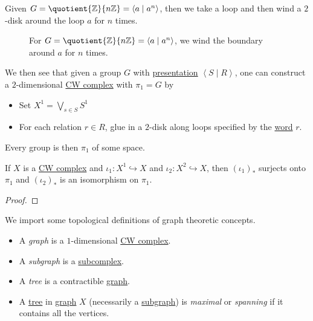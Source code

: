 \begin{eg}
	Given \(G = \quotient{\mathbb{\MakeUppercase{z}} }{n\mathbb{\MakeUppercase{z}} } = \left< a\mid a^n \right>\), then we take a loop and then wind a \(2\)-disk
	around the loop \(a\) for \(n\) times.
	\begin{figure}[H]
		\centering
		\caption{For \(G = \quotient{\mathbb{\MakeUppercase{z}}}{n\mathbb{\MakeUppercase{z}} } = \left< a \mid a^n \right> \), we wind the boundary around \(a\) for \(n\) times.}
		\label{fig:lec12-eg}
	\end{figure}
\end{eg}

We then see that given a group \(G\) with \hyperref[def:group-presentation]{presentation} \(\left< S \mid R \right> \), one can construct a \(2\)-dimensional \hyperref[def:CW-Complex]{CW complex}
with \(\pi _1 = G\) by
\begin{itemize}
	\item Set \(X^1 = \bigvee_{s\in S} S^1\)
	\item For each relation \(r\in R\), glue in a \(2\)-disk along loops specified by the \hyperref[def:word]{word} \(r\).
\end{itemize}
Every group is then \(\pi _1\) of some space.

\begin{theorem}
	If \(X\) is a \hyperref[def:CW-Complex]{CW complex} and \(\iota _1\colon X^1\hookrightarrow X\) and \(\iota_2 \colon X^2\hookrightarrow X\),
	then \((\iota _1)_{\ast}\) surjects onto \(\pi _1\) and \((\iota _2)_{\ast}\) is an isomorphism on \(\pi _1\).
\end{theorem}
\begin{proof}
\end{proof}

\begin{definition}\label{def:graph}\label{def:subgraph}\label{def:tree}\label{def:maximal-tree}
	We import some topological definitions of graph theoretic concepts.
	\begin{itemize}
		\item A \emph{graph} is a \(1\)-dimensional \hyperref[def:CW-Complex]{CW complex}.
		\item A \emph{subgraph} is a \hyperref[def:CW-subcomplex]{subcomplex}.
		\item A \emph{tree} is a contractible \hyperref[def:graph]{graph}.
		\item A \hyperref[def:tree]{tree} in \hyperref[def:graph]{graph} \(X\) (necessarily a \hyperref[def:subgraph]{subgraph}) is
		      \emph{maximal} or \emph{spanning} if it contains all the vertices.
	\end{itemize}
\end{definition}

